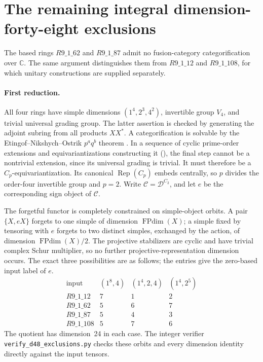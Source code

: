 \section{The remaining integral dimension-forty-eight exclusions}
\label{sec:d48-exclusions}
\begin{theorem}
The based rings $R9\_1\_62$ and $R9\_1\_87$ admit no fusion-category
categorification over $\mathbb C$. The same argument distinguishes them from
$R9\_1\_12$ and $R9\_1\_108$, for which unitary constructions are supplied
separately.
\end{theorem}

\paragraph{First reduction.}
All four rings have simple dimensions $(1^4,2^3,4^2)$, invertible group
$V_4$, and trivial universal grading group. The latter assertion is checked
by generating the adjoint subring from all products $XX^*$.
A categorification is solvable by the Etingof--Nikshych--Ostrik
$p^a q^b$ theorem \cite[Theorem~1.6]{ENOSolvable}. In a sequence of cyclic
prime-order extensions and equivariantizations constructing it
(\cite[Proposition~4.4]{ENOSolvable}), the final step cannot be a nontrivial
extension, since its universal grading is trivial. It must therefore be a
$C_p$-equivariantization. Its canonical $\operatorname{Rep}(C_p)$ embeds
centrally, so $p$ divides the order-four invertible group and $p=2$.
Write $\mathcal C=\mathcal D^{C_2}$, and let $e$ be the corresponding sign
object of $\mathcal C$.

The forgetful functor is completely constrained on simple-object orbits.
A pair $\{X,eX\}$ forgets to one simple of dimension $\operatorname{FPdim}(X)$;
a simple fixed by tensoring with $e$ forgets to two distinct simples,
exchanged by the action, of dimension $\operatorname{FPdim}(X)/2$.
The projective stabilizers are cyclic and have trivial complex Schur
multiplier, so no further projective-representation dimension occurs.
The exact three possibilities are as follows; the entries give the
zero-based input label of $e$.
\[
\begin{array}{c|ccc}
\text{input}&(1^8,4)&(1^4,2,4)&(1^4,2^5)\\\hline
R9\_1\_12&7&1&2\\
R9\_1\_62&5&6&7\\
R9\_1\_87&5&4&3\\
R9\_1\_108&5&7&6
\end{array}
\]
The quotient has dimension~24 in each case. The integer verifier
\nolinkurl{verify_d48_exclusions.py} checks these orbits and every dimension
identity directly against the input tensors.

